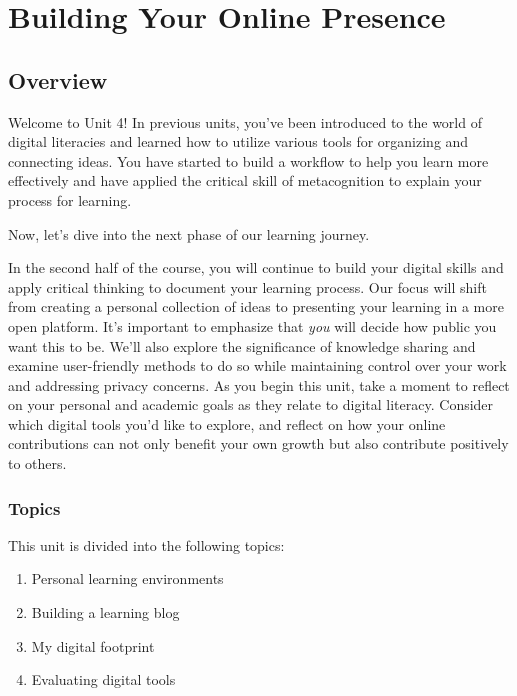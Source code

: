 \documentclass[
  letterpaper,
  DIV=11,
  numbers=noendperiod]{scrreprt}
\providecommand{\tightlist}{%
  \setlength{\itemsep}{0pt}\setlength{\parskip}{0pt}}\usepackage{longtable,booktabs,array}
\begin{document}

\chapter{Building Your Online
Presence}\label{building-your-online-presence}

\section*{Overview}\label{overview-3}


Welcome to Unit 4! In previous units, you've been introduced to the
world of digital literacies and learned how to utilize various tools for
organizing and connecting ideas. You have started to build a workflow to
help you learn more effectively and have applied the critical skill of
metacognition to explain your process for learning.

Now, let's dive into the next phase of our learning journey.

In the second half of the course, you will continue to build your
digital skills and apply critical thinking to document your learning
process. Our focus will shift from creating a personal collection of
ideas to presenting your learning in a more open platform. It's
important to emphasize that \emph{you} will decide how public you want
this to be. We'll also explore the significance of knowledge sharing and
examine user-friendly methods to do so while maintaining control over
your work and addressing privacy concerns. As you begin this unit, take
a moment to reflect on your personal and academic goals as they relate
to digital literacy. Consider which digital tools you'd like to explore,
and reflect on how your online contributions can not only benefit your
own growth but also contribute positively to others.

\subsection*{Topics}\label{topics-3}

This unit is divided into the following topics:

\begin{enumerate}
\def\labelenumi{\arabic{enumi}.}
\tightlist
\item
  Personal learning environments
\item
  Building a learning blog
\item
  My digital footprint
\item
  Evaluating digital tools
\end{enumerate}
\end{document}
